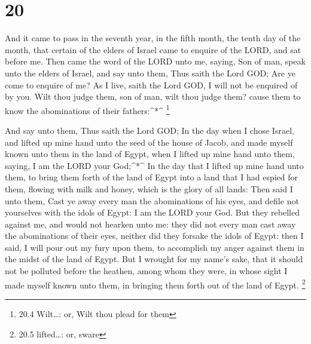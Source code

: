 \hypertarget{section-19}{%
\section{20}\label{section-19}}

 And it came to pass in the seventh year, in the fifth
month, the tenth day of the month, that certain of the elders of Israel
came to enquire of the LORD, and sat before me.  Then came
the word of the LORD unto me, saying,  Son of man, speak
unto the elders of Israel, and say unto them, Thus saith the Lord GOD;
Are ye come to enquire of me? As I live, saith the Lord GOD, I will not
be enquired of by you.  Wilt thou judge them, son of man,
wilt thou judge them? cause them to know the abominations of their
fathers:\^{}*\^{} \footnote{20.4 Wilt\ldots: or, Wilt thou plead for
  them}

 And say unto them, Thus saith the Lord GOD; In the day when
I chose Israel, and lifted up mine hand unto the seed of the house of
Jacob, and made myself known unto them in the land of Egypt, when I
lifted up mine hand unto them, saying, I am the LORD your God;\^{}*\^{}
 In the day that I lifted up mine hand unto them, to bring
them forth of the land of Egypt into a land that I had espied for them,
flowing with milk and honey, which is the glory of all lands:
 Then said I unto them, Cast ye away every man the
abominations of his eyes, and defile not yourselves with the idols of
Egypt: I am the LORD your God.  But they rebelled against
me, and would not hearken unto me: they did not every man cast away the
abominations of their eyes, neither did they forsake the idols of Egypt:
then I said, I will pour out my fury upon them, to accomplish my anger
against them in the midst of the land of Egypt.  But I
wrought for my name's sake, that it should not be polluted before the
heathen, among whom they were, in whose sight I made myself known unto
them, in bringing them forth out of the land of Egypt. \footnote{20.5
  lifted\ldots: or, sware}

